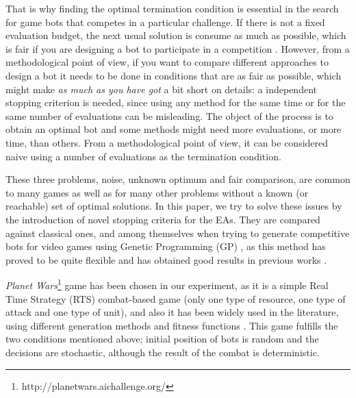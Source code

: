 \documentclass[runningheads,a4paper]{llncs}
\begin{document}
That is why finding the optimal termination condition is essential in the 
search for game bots that competes in a particular challenge. If there is not a 
fixed evaluation budget, the next usual solution is consume as much as possible, 
which is fair if you are designing a bot %
to participate in a competition
\cite{DBLP:conf/cec/Fernandez-AresMGGF11}. However, from a
methodological point of view, if you want to compare different
approaches to design a bot it needs to be done in conditions that are
as fair as possible, which might make {\em as much as you have got} a bit short 
on details: a independent stopping criterion is needed, since using any method 
for the same time or for the same number of evaluations can be misleading. 
The object of the process is to obtain an optimal bot and some methods might 
need more evaluations, or more time, than others.
From a methodological point of view, it can be considered naive using a number of evaluations as the termination condition.

These three problems, noise, unknown optimum and fair comparison, are common to 
many games as well as for many other problems without a known (or reachable) 
set of optimal solutions. In this paper, we try to solve these issues by the
introduction of novel stopping criteria for the EAs. They are compared 
against classical ones, and among themselves when trying to generate 
competitive bots for video games using Genetic Programming (GP) 
\cite{GP_Koza92}, as this method has proved to be quite flexible and has 
obtained good results in previous works \cite{EvoStar2014:GPBot}.%

\textit{Planet Wars}\footnote{http://planetwars.aichallenge.org/} game 
 has been chosen in our experiment, as it is a simple Real Time Strategy (RTS) combat-based game (only one type of resource, one type of attack and one type of unit), and also it has been widely used in the literature, using different generation methods and fitness functions \cite{DBLP:journals/jcst/MoraFGGF12,DBLP:conf/cec/Fernandez-AresMGGF11,DBLP:journals/nc/Lara-CabreraCL14,NogueiraCoevolutionary14}. This
game fulfills the two conditions mentioned above; initial position of bots is 
random and the decisions are stochastic, although the result of the combat is deterministic. 
\end{document}
